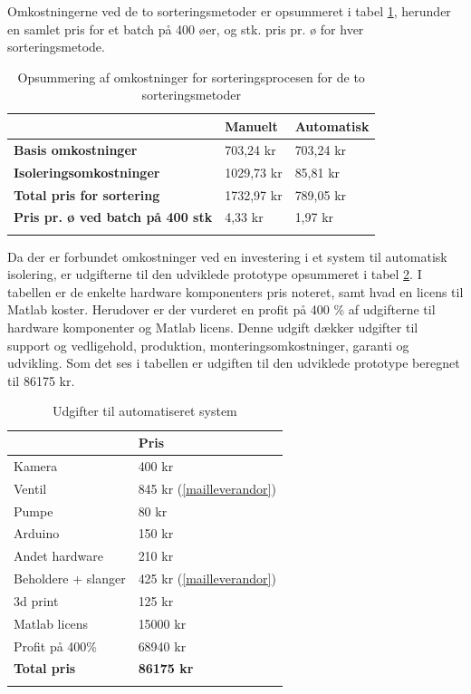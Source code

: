 Omkostningerne ved de to sorteringsmetoder er opsummeret i tabel \ref{tab:totalcost}, herunder en samlet pris for et batch på 400 øer, og stk. pris pr. ø for hver sorteringsmetode.
\begin{center}
		\begin{longtable}{ | m{8cm} | m{2.25cm} | m{2.25cm} | } 
			\hline
			 &\textbf{Manuelt} & \textbf{Automatisk} \\ 
			\hline
			 \textbf{Basis omkostninger} & 703,24 kr & 703,24 kr \\ 
			\hline
			 \textbf{Isoleringsomkostninger} & 1029,73 kr & 85,81 kr \\ 
			\hline
			\textbf{Total pris for sortering} & 1732,97 kr & 789,05 kr \\ 
			\hline
			\textbf{Pris pr. ø ved batch på 400 stk} & 4,33 kr & 1,97 kr \\ 
			\hline
			\caption{Opsummering af omkostninger for sorteringsprocesen for de to sorteringsmetoder}
			\label{tab:totalcost}
			 		\end{longtable}
\end{center}

Da der er forbundet omkostninger ved en investering i et system til automatisk isolering, er udgifterne til den udviklede prototype opsummeret i tabel \ref{tab:prototypecost}. I tabellen er de enkelte hardware komponenters pris noteret, samt hvad en licens til Matlab koster. Herudover er der vurderet en profit på 400 \% af udgifterne til hardware komponenter og Matlab licens. Denne udgift dækker udgifter til support og vedligehold, produktion, monteringsomkostninger, garanti og udvikling. Som det ses i tabellen er udgiften til den udviklede prototype beregnet til 86175 kr.
\begin{center}
		\begin{longtable}{ | m{9.5cm} | m{3.5cm} | } 
			\hline
			  & \textbf{Pris} \\ 
			\hline
			Kamera & 400 kr \citep{DH2}  \\ 
			\hline
			 Ventil  & 845 kr (\ref{mailleverandor})\\ 
			\hline
			Pumpe  & 80 kr \citep{DH8} \\ 
			\hline
			Arduino  & 150 kr \citep{DH3}\\ 
			\hline
			Andet hardware & 210 kr \\ 
			\hline
			Beholdere + slanger  & 425 kr (\ref{mailleverandor})\\ 
			\hline
			3d print & 125 kr \\ 
			\hline
			Matlab licens & 15000 kr \\
			\hline
			Profit på 400\% & 68940 kr \\	
			\hline
			\textbf{Total pris} & \textbf{86175 kr} \\		
			
			\hline
			\caption{Udgifter til automatiseret system}
			\label{tab:prototypecost}
			 		\end{longtable}
\end{center}


